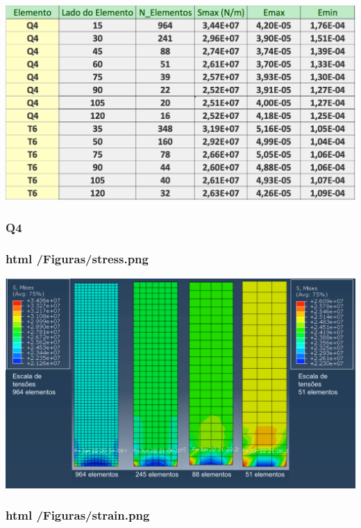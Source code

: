 \begin{DoxyImageNoCaption}
  \mbox{\includegraphics[width=\textwidth,height=\textheight/2,keepaspectratio=true]{tabela.png}}
\end{DoxyImageNoCaption}
 

\subsubsection*{Q4}

\subsubsection*{html /\+Figuras/stress.png}


\begin{DoxyImageNoCaption}
  \mbox{\includegraphics[width=\textwidth,height=\textheight/2,keepaspectratio=true]{stress.png}}
\end{DoxyImageNoCaption}
 

\subsubsection*{html /\+Figuras/strain.png}


